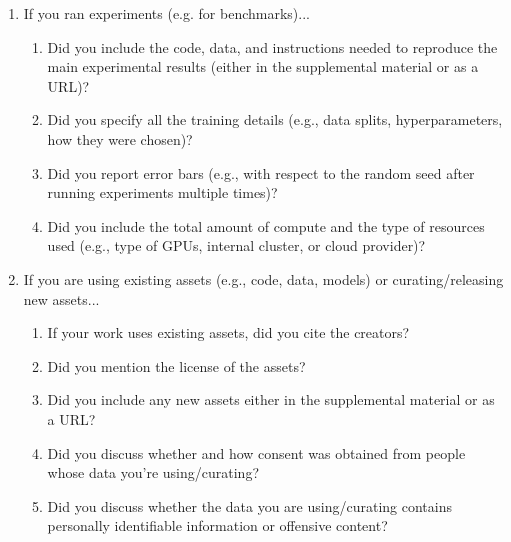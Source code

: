 \documentclass{article}
\begin{document}
\begin{enumerate}
\item If you ran experiments (e.g. for benchmarks)...
\begin{enumerate}
  \item Did you include the code, data, and instructions needed to reproduce the main experimental results (either in the supplemental material or as a URL)?
  \item Did you specify all the training details (e.g., data splits, hyperparameters, how they were chosen)?
	\item Did you report error bars (e.g., with respect to the random seed after running experiments multiple times)?
	\item Did you include the total amount of compute and the type of resources used (e.g., type of GPUs, internal cluster, or cloud provider)?
\end{enumerate}

\item If you are using existing assets (e.g., code, data, models) or curating/releasing new assets...
\begin{enumerate}
  \item If your work uses existing assets, did you cite the creators?
    \answerYes{}
  \item Did you mention the license of the assets?
  \item Did you include any new assets either in the supplemental material or as a URL?
  \item Did you discuss whether and how consent was obtained from people whose data you're using/curating?
  \item Did you discuss whether the data you are using/curating contains personally identifiable information or offensive content?
\end{enumerate}


\end{enumerate}
\end{document}
